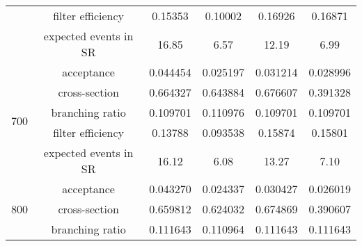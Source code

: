 \begin{table}[htbp]
\begin{center}
{\begin{tabular}{cccccc}
                                         & filter efficiency     & 0.15353                                    & 0.10002                                        & 0.16926                                    & 0.16871\\
                                         & expected events in SR & 16.85                                      & 6.57                                           & 12.19                                      & 6.99\\
                \hline
                \multirow{5}{*}{700}     & acceptance            & 0.044454                                   & 0.025197                                       & 0.031214                                   & 0.028996\\
                                         & cross-section         & 0.664327                                   & 0.643884                                       & 0.676607                                   & 0.391328\\
                                         & branching ratio       & 0.109701                                   & 0.110976                                       & 0.109701                                   & 0.109701\\
                                         & filter efficiency     & 0.13788                                    & 0.093538                                       & 0.15874                                    & 0.15801\\
                                         & expected events in SR & 16.12                                      & 6.08                                           & 13.27                                      & 7.10\\
                \hline
                \multirow{5}{*}{800}     & acceptance            & 0.043270                                   & 0.024337                                       & 0.030427                                   & 0.026019\\
                                         & cross-section         & 0.659812                                   & 0.624032                                       & 0.674869                                   & 0.390607\\
                                         & branching ratio       & 0.111643                                   & 0.110964                                       & 0.111643                                   & 0.111643\\

\end{tabular}}
\end{center}
\end{table}
